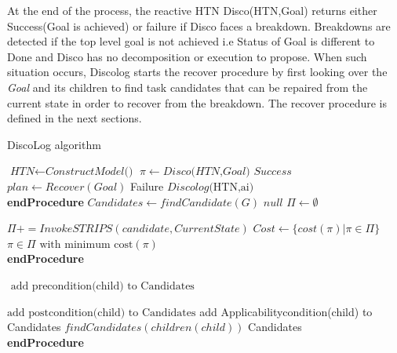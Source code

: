 At the end of the process,  the reactive HTN Disco(HTN,Goal) returns either Success(Goal is achieved) or failure if Disco faces a breakdown. Breakdowns are detected if the top level goal is not achieved i.e Status of Goal is different to Done and Disco has no decomposition or execution to propose. When such situation occurs, Discolog starts the recover procedure by first looking over the \textit{Goal} and its children to find task candidates that can be repaired from the current state in order to recover from the breakdown. The recover procedure is defined in the next sections.  
\begin{algorithm}
	\caption{DiscoLog algorithm }\label{euclid}
	\begin{algorithmic}[]
		\State $\textit{HTN} \gets\textit{ConstructModel()} $
		\State $\pi \gets Disco \textit{(HTN,Goal)}$
		\State \Return $\textit{Success} $
		\Else 
		\State$ plan \gets Recover(Goal)$
		\State \Return Failure
		\Else 
		\State  $\textit{Discolog} \text{(HTN,ai)}$
		\EndFor
		\EndIf
		\EndIf
		\\
		\EndProcedure \textbf{endProcedure}
		\State 
		\State $\textit{Candidates}\gets\textit{findCandidate}{(G)} $
		\State \Return $\textit{null} $
		\Else 
		\State $\Pi \gets \emptyset$
		
		\State $\Pi += InvokeSTRIPS(candidate,CurrentState)$
		\State  $Cost \gets \{ cost(\pi) | \pi \in  \Pi \} $
		\EndFor
		\EndIf
		\State \Return $\pi \in \Pi \text{ with minimum cost}(\pi)$
		\\
		\EndProcedure \textbf{endProcedure}
		
		\State 
		
		\State $  \text{ add precondition(child) to Candidates}$
		
		\State $\text{add postcondition(child) to Candidates}$
		\EndIf
		\State add Applicabilitycondition(child) to Candidates
		\EndIf
		\State $\textit{findCandidates} (children(child))$
		\EndFor
		\State \Return Candidates
		\\
		\EndProcedure \textbf{endProcedure}
		
	\end{algorithmic}
\end{algorithm}
